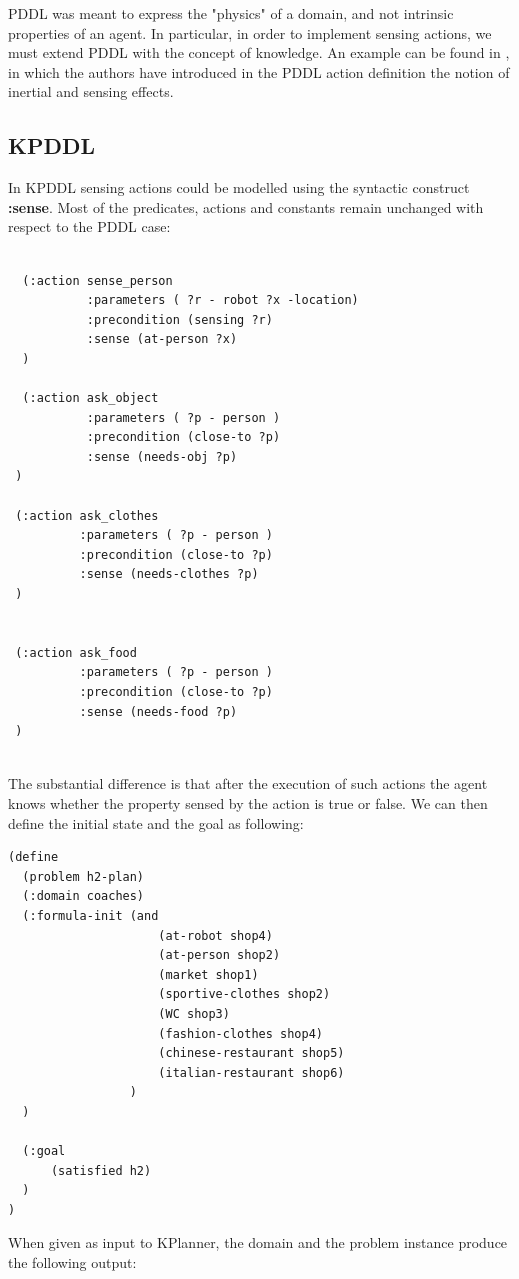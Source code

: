 \documentclass[pdftex,12pt,a4paper]{report}
\begin{document}
\noindent PDDL was meant to express the "physics" of a domain, and not intrinsic properties of an agent.
In particular, in order to implement sensing actions, we must extend PDDL with the concept of knowledge. An example can be found in \cite{iocchi2003}, in which the authors have introduced in the PDDL action definition the notion of inertial and sensing effects.

\newpage
\subsection{KPDDL}
In KPDDL sensing actions could be modelled using the syntactic construct \textbf{:sense}. Most of the predicates, actions and constants remain unchanged with respect to the PDDL case:
\begin{verbatim}

  (:action sense_person
           :parameters ( ?r - robot ?x -location)
           :precondition (sensing ?r)
           :sense (at-person ?x)
  )

  (:action ask_object
           :parameters ( ?p - person )
           :precondition (close-to ?p)
           :sense (needs-obj ?p)
 )

 (:action ask_clothes
          :parameters ( ?p - person )
          :precondition (close-to ?p)
          :sense (needs-clothes ?p)
 )


 (:action ask_food
          :parameters ( ?p - person )
          :precondition (close-to ?p)
          :sense (needs-food ?p)
 )
\end{verbatim}\\
\noindent The substantial difference is that after the execution of such actions the agent knows whether the property sensed by the action is true or false. 
\noindent We can then define the initial state and the goal as following:
\begin{verbatim}
(define
  (problem h2-plan)
  (:domain coaches)
  (:formula-init (and
                     (at-robot shop4)
                     (at-person shop2)
                     (market shop1)
                     (sportive-clothes shop2)
                     (WC shop3)
                     (fashion-clothes shop4)
                     (chinese-restaurant shop5)
                     (italian-restaurant shop6)
                 )
  )

  (:goal
      (satisfied h2)
  )
)
\end{verbatim}
\noindent When given as input to KPlanner, the domain and the problem instance produce the following output:
\end{document}
